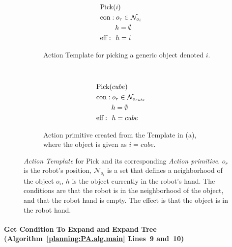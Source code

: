 \begin{figure}
\centering
          \begin{subfigure}[b]{0.35\columnwidth}
\begin{equation*}
\begin{aligned}
&\mbox{Pick}(i)   \\   
&\mbox{con}: o_r \in \mathcal{N}_{o_i} \hspace{2em} \\ 
&\hspace{2.2em}h  =  \emptyset \\	  
&\mbox{eff}:\hspace{0.4em}  h = i \hspace{1em} 
\end{aligned}
\end{equation*}
\caption{Action Template for picking a generic object denoted $i$.\\}
\end{subfigure}
~
\begin{subfigure}[b]{0.35\columnwidth}
\begin{equation*}
\begin{aligned}
&\mbox{Pick}(cube)   \\   
&\mbox{con}: o_r \in \mathcal{N}_{o_{cube}} \hspace{2em} \\ 
&\hspace{2.2em}h  =  \emptyset \\	  
&\mbox{eff}:\hspace{0.4em} h = cube \hspace{1em} 
\end{aligned}
\end{equation*}
\caption{Action primitive created from the Template in (a), where the object is given as $i= cube$.}
\end{subfigure}
\caption{\emph{Action Template} for Pick and its corresponding \emph{Action primitive}. $o_r$ is the robot's position, $\mathcal{N}_{o_i}$ is a set that defines a neighborhood of the object $o_i$, $h$ is the object currently in the robot's hand. The conditions are that the robot is in the neighborhood of the object, and that the robot hand is empty. The effect is that the object is in the robot hand.}
\label{planning.pabt.fig.acttemplate}
\end{figure}



\paragraph*{\textbf{Get Condition To Expand and Expand Tree (Algorithm~\ref{planning:PA.alg.main} Lines~9 and~10) }\\}

